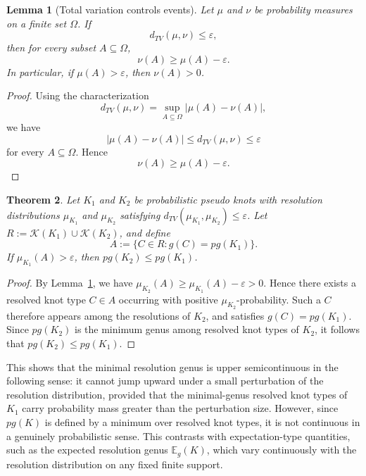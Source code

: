 \documentclass[a4paper, reqno, 12pt]{amsart}
\theoremstyle{plain}
\newtheorem{theorem}{Theorem}[section]
\newtheorem{lemma}[theorem]{Lemma}
\theoremstyle{definition}
\begin{document}
\begin{lemma}[Total variation controls events]
\label{lem:TV-events}
Let \(\mu\) and \(\nu\) be probability measures on a finite set \(\Omega\). If
\[
d_{TV}(\mu,\nu)\le \varepsilon,
\]
then for every subset \(A\subseteq \Omega\),
\[
\nu(A)\ge \mu(A)-\varepsilon.
\]
In particular, if \(\mu(A)>\varepsilon\), then \(\nu(A)>0\).
\end{lemma}

\begin{proof}
Using the characterization
\[
d_{TV}(\mu,\nu)
=
\sup_{A\subseteq\Omega}
|\mu(A)-\nu(A)|,
\]
we have
\[
|\mu(A)-\nu(A)|\le d_{TV}(\mu,\nu)\le\varepsilon
\]
for every \(A\subseteq\Omega\). Hence
\[
\nu(A)\ge \mu(A)-\varepsilon.
\]
\end{proof}

\begin{theorem}
\label{thm:pg-stability-one-sided}
Let \(K_1\) and \(K_2\) be probabilistic pseudo knots with resolution distributions \(\mu_{K_1}\) and \(\mu_{K_2}\) satisfying \(d_{TV}(\mu_{K_1},\mu_{K_2})\le \varepsilon\). Let
\(R:=\mathcal K(K_1)\cup\mathcal K(K_2)\), and define
\[
A:=
\{C\in R: g(C)=pg(K_1)\}.
\]
If \(\mu_{K_1}(A)>\varepsilon\), then \(pg(K_2)\le pg(K_1)\).
\end{theorem}

\begin{proof}
By Lemma~\ref{lem:TV-events}, we have \(\mu_{K_2}(A) \ge \mu_{K_1}(A)-\varepsilon >0\). Hence there exists a resolved knot type \(C\in A\) occurring with positive \(\mu_{K_2}\)-probability. Such a \(C\) therefore appears among the resolutions of \(K_2\), and satisfies \(g(C)=pg(K_1)\). Since \(pg(K_2)\) is the minimum genus among resolved knot types of \(K_2\), it follows that \(pg(K_2)\le pg(K_1)\).
\end{proof}

This shows that the minimal resolution genus is upper semicontinuous in the following sense: it cannot jump upward under a small perturbation of the resolution distribution, provided that the minimal-genus resolved knot types of \(K_1\) carry probability mass greater than the perturbation size. However, since \(pg(K)\) is defined by a minimum over resolved knot types, it is not continuous in a genuinely probabilistic sense. This contrasts with expectation-type quantities, such as the expected resolution genus \(\mathbb E_g(K)\), which vary continuously with the resolution distribution on any fixed finite support.
\end{document}
